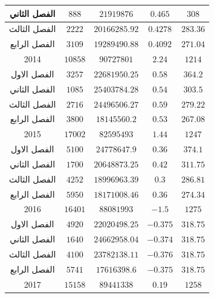 \documentclass[10pt,a4paper]{report}
\begin{document}
\begin{longtable}{|c|c|c|c|c|}
	الفصل الثاني & $888$                           & $21919876$    & $0.465$     & $308$     \\ \hline
	الفصل الثالث & $2222$                          & $20166285.92$ & $0.4278$    & $283.36$  \\ \hline
	الفصل الرابع & $3109$                          & $19289490.88$ & $0.4092$    & $271.04$  \\ \hline
	2014         & $10858$                         & $90727801$    & $2.24$      & $1214$    \\ \hline
	الفصل الاول  & $3257$                          & $22681950.25$ & $0.58$      & $364.2$   \\ \hline
	الفصل الثاني & $1085$                          & $25403784.28$ & $0.54$      & $303.5$   \\ \hline
	الفصل الثالث & $2716$                          & $24496506.27$ & $0.59$      & $279.22$  \\ \hline
	الفصل الرابع & $3800$                          & $18145560.2$  & $0.53$      & $267.08$  \\ \hline
	2015         & $17002$                         & $82595493$    & $1.44$      & $1247$    \\ \hline
	الفصل الاول  & $5100$                          & $24778647.9$  & $0.36$      & $374.1$   \\ \hline
	الفصل الثاني & $1700$                          & $20648873.25$ & $0.42$      & $311.75$  \\ \hline
	الفصل الثالث & $4252$                          & $18996963.39$ & $0.3$       & $286.81$  \\ \hline
	الفصل الرابع & $5950$                          & $18171008.46$ & $0.36$      & $274.34$  \\ \hline
	2016         & $16401$                         & $88081993$    & $-1.5$      & $1275$    \\ \hline
	الفصل الاول  & $4920$                          & $22020498.25$ & $-0.375$    & $318.75$  \\ \hline
	الفصل الثاني & $1640$                          & $24662958.04$ & $-0.374$    & $318.75$  \\ \hline
	الفصل الثالث & $4100$                          & $23782138.11$ & $-0.376$    & $318.75$  \\ \hline
	الفصل الرابع & $5741$                          & $17616398.6$  & $-0.375$    & $318.75$  \\ \hline
	2017         & $15158$                         & $89441338$    & $0.19$      & $1258$    \\ \hline

\end{longtable}
\end{document}

